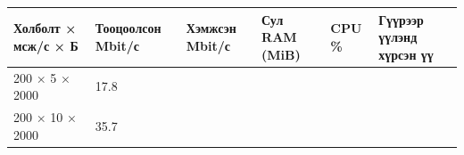 \begingroup\scriptsize\begin{longtable}[]{@{}llllll@{}}
\toprule
\begin{minipage}[b]{0.14\columnwidth}\raggedright
Холболт × мсж/с × Б\strut
\end{minipage} & \begin{minipage}[b]{0.14\columnwidth}\raggedright
Тооцоолсон Mbit/с\strut
\end{minipage} & \begin{minipage}[b]{0.14\columnwidth}\raggedright
Хэмжсэн Mbit/с\strut
\end{minipage} & \begin{minipage}[b]{0.14\columnwidth}\raggedright
Сул RAM (MiB)\strut
\end{minipage} & \begin{minipage}[b]{0.14\columnwidth}\raggedright
CPU \%\strut
\end{minipage} & \begin{minipage}[b]{0.14\columnwidth}\raggedright
Гүүрээр үүлэнд хүрсэн үү\strut
\end{minipage}\tabularnewline
\midrule
\endhead
\begin{minipage}[t]{0.14\columnwidth}\raggedright
200 × 5 × 2000\strut
\end{minipage} & \begin{minipage}[t]{0.14\columnwidth}\raggedright
17.8\strut
\end{minipage} & \begin{minipage}[t]{0.14\columnwidth}\raggedright
\strut
\end{minipage} & \begin{minipage}[t]{0.14\columnwidth}\raggedright
\strut
\end{minipage} & \begin{minipage}[t]{0.14\columnwidth}\raggedright
\strut
\end{minipage} & \begin{minipage}[t]{0.14\columnwidth}\raggedright
\strut
\end{minipage}\tabularnewline
\begin{minipage}[t]{0.14\columnwidth}\raggedright
200 × 10 × 2000\strut
\end{minipage} & \begin{minipage}[t]{0.14\columnwidth}\raggedright
35.7\strut
\end{minipage} & \begin{minipage}[t]{0.14\columnwidth}\raggedright
\strut
\end{minipage} & \begin{minipage}[t]{0.14\columnwidth}\raggedright

\end{minipage}
\end{longtable}
